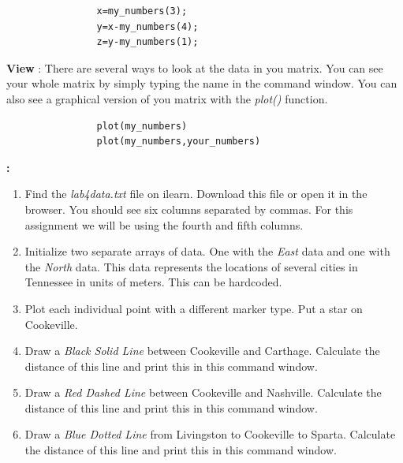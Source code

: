 \documentclass[11pt]{article}
\newcommand{\NUM}{4}
\begin{document}
\begin{description}
\begin{description}
                \begin{verbatim}
                x=my_numbers(3);
                y=x-my_numbers(4);
                z=y-my_numbers(1);
                \end{verbatim}	

	\item \textbf {View} : There are several ways to look at the data in you matrix. You can see your whole matrix by simply typing the name in the command window. You can also see a graphical version of you matrix with the {\it plot()} function. 

                \begin{verbatim}
                plot(my_numbers)
                plot(my_numbers,your_numbers)
                \end{verbatim}	
    
        \end{description}		 
\newpage	
        \item [\textbf{ \Large Assignment}] \textbf{ \Large :}\\

        \begin{enumerate}

	\item Find the {\it lab\NUM\textunderscore data.txt} file on ilearn. Download this file or open it in the browser. You should see six columns separated by commas. For this assignment we will be using the fourth and fifth columns. 
	
	\item Initialize two separate arrays of data. One with the {\it East} data and one with the {\it North} data. This data represents the locations of several cities in Tennessee in units of meters. This can be hardcoded.
	
	\item Plot each individual point with a different marker type. Put a star on Cookeville. 

	\item Draw a {\it Black Solid Line} between Cookeville and Carthage. Calculate the distance of this line and print this in this command window.	

	\item Draw a  {\it Red Dashed Line} between Cookeville and Nashville. Calculate the distance of this line and print this in this command window.
	
	\item Draw a {\it Blue Dotted Line} from Livingston to Cookeville to Sparta. Calculate the distance of this line and print this in this command window.


\end{enumerate}
\end{description}
\end{document}
